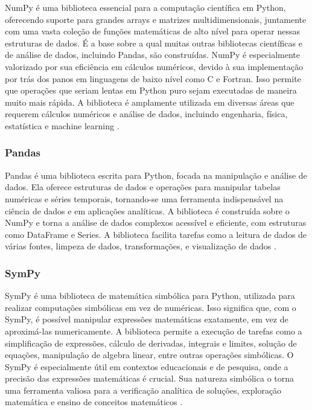 NumPy é uma biblioteca essencial para a computação científica em Python, oferecendo suporte para grandes arrays e
matrizes multidimensionais, juntamente com uma vasta coleção de funções matemáticas de alto nível para operar nessas
estruturas de dados.
É a base sobre a qual muitas outras bibliotecas científicas e de análise de dados, incluindo Pandas, são construídas.
NumPy é especialmente valorizado por sua eficiência em cálculos numéricos, devido à sua implementação por trás dos panos
em linguagens de baixo nível como C e Fortran.
Isso permite que operações que seriam lentas em Python puro sejam executadas de maneira muito mais rápida.
A biblioteca é amplamente utilizada em diversas áreas que requerem cálculos numéricos e análise de dados, incluindo
engenharia, física, estatística e machine learning \cite{numpy}.

\subsubsection{Pandas}

Pandas é uma biblioteca escrita para Python, focada na manipulação e análise de dados.
Ela oferece estruturas de dados e operações para manipular tabelas numéricas e séries temporais, tornando-se uma
ferramenta indispensável na ciência de dados e em aplicações analíticas.
A biblioteca é construída sobre o NumPy e torna a análise de dados complexos acessível e eficiente, com estruturas como
DataFrame e Series.
A biblioteca facilita tarefas como a leitura de dados de várias fontes, limpeza de dados, transformações, e visualização
de dados \cite{pandas}.

\subsubsection{SymPy}

SymPy é uma biblioteca de matemática simbólica para Python, utilizada para realizar computações simbólicas em vez de
numéricas.
Isso significa que, com o SymPy, é possível manipular expressões matemáticas exatamente, em vez de aproximá-las
numericamente.
A biblioteca permite a execução de tarefas como a simplificação de expressões, cálculo de derivadas, integrais e
limites, solução de equações, manipulação de algebra linear, entre outras operações simbólicas.
O SymPy é especialmente útil em contextos educacionais e de pesquisa, onde a precisão das expressões matemáticas é
crucial.
Sua natureza simbólica o torna uma ferramenta valiosa para a verificação analítica de soluções, exploração matemática e
ensino de conceitos matemáticos \cite{sympy}.

